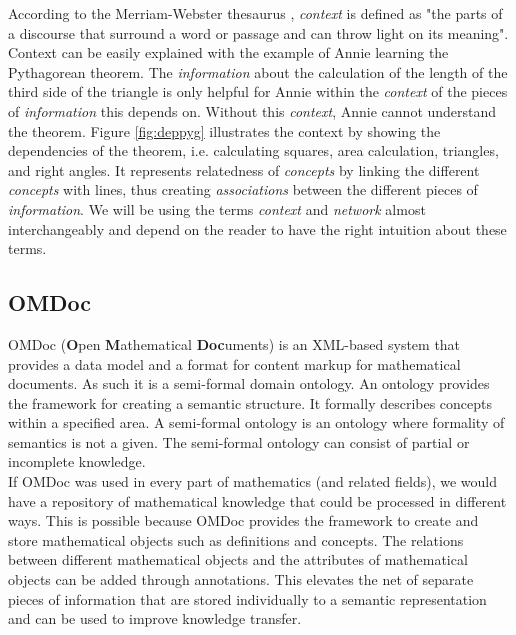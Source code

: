 \documentclass[twoside, 12pt]{article}
\begin{document}
According to the Merriam-Webster thesaurus \cite{Webster:npentrel14}, \textit{context} is defined as "the parts of a discourse that surround a word or passage and can throw light on its meaning". Context can be easily explained with the example of Annie learning the Pythagorean theorem. The \textit{information} about the calculation of the length of the third side of the triangle is only helpful for Annie within the \textit{context} of the pieces of \textit{information} this depends on. Without this \textit{context}, Annie cannot understand the theorem. Figure \ref{fig:deppyg} illustrates the context by showing the dependencies of the theorem, i.e. calculating squares, area calculation, triangles, and right angles. It represents relatedness of \textit{concepts} by linking the different \textit{concepts} with lines, thus creating \textit{associations} between the different pieces of \textit{information}. We will be using the terms \textit{context} and \textit{network} almost interchangeably and depend on the reader to have the right intuition about these terms.\\

\subsection{OMDoc}
\label{sec:OMDoc}

OMDoc (\textbf{O}pen \textbf{M}athematical \textbf{Doc}uments) \cite{Kohlhase:OMDoc1.2} is an XML-based system that provides a data model and a format for content markup for mathematical documents. As such it is a semi-formal domain ontology. An ontology provides the framework for creating a semantic structure. It formally describes concepts within a specified area. A semi-formal ontology \cite{Sheth:npentrel14} is an ontology where formality of semantics is not a given. The semi-formal ontology can consist of partial or incomplete knowledge. \\

If OMDoc was used in every part of mathematics (and related fields), we would have a repository of mathematical knowledge that could be processed in different ways. This is possible because OMDoc provides the framework to create and store mathematical objects such as definitions and concepts. The relations between different mathematical objects and the attributes of mathematical objects can be added through annotations. This elevates the net of separate pieces of information that are stored individually to a semantic representation and can be used to improve knowledge transfer.\\
\end{document}
